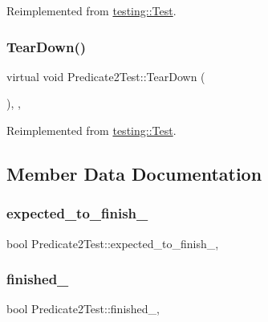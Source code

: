 Reimplemented from \mbox{\hyperlink{classtesting_1_1_test_a5f0ab439802cbe0ef7552f1a9f791923}{testing\+::\+Test}}.

\mbox{\label{class_predicate2_test_a7379f8f7772af6b4c76edcc90b6aaaeb}} 
\subsubsection{\texorpdfstring{TearDown()}{TearDown()}\hspace{0.1cm}{\footnotesize\ttfamily [3/3]}}
{\footnotesize\ttfamily virtual void Predicate2\+Test\+::\+Tear\+Down (\begin{DoxyParamCaption}{ }\end{DoxyParamCaption})\hspace{0.3cm}{\ttfamily [inline]}, {\ttfamily [protected]}, {\ttfamily [virtual]}}



Reimplemented from \mbox{\hyperlink{classtesting_1_1_test_a5f0ab439802cbe0ef7552f1a9f791923}{testing\+::\+Test}}.



\subsection{Member Data Documentation}
\mbox{\label{class_predicate2_test_a56cf1f0f556addd9a62e0644dc1a86fc}} 
\subsubsection{\texorpdfstring{expected\_to\_finish\_}{expected\_to\_finish\_}}
{\footnotesize\ttfamily bool Predicate2\+Test\+::expected\+\_\+to\+\_\+finish\+\_\+\hspace{0.3cm}{\ttfamily [static]}, {\ttfamily [protected]}}

\mbox{\label{class_predicate2_test_a30f4ef76d3004253078e767e5c653b85}} 
\subsubsection{\texorpdfstring{finished\_}{finished\_}}
{\footnotesize\ttfamily bool Predicate2\+Test\+::finished\+\_\+\hspace{0.3cm}{\ttfamily [static]}, {\ttfamily [protected]}}

